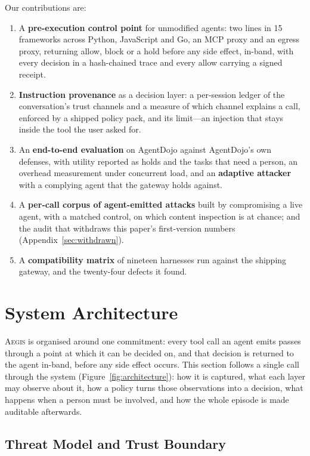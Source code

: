 \documentclass[sigconf,nonacm]{acmart}
\newcommand{\system}{\textsc{Aegis}\xspace}
\begin{document}
\medskip\noindent Our contributions are:
\begin{enumerate}[nolistsep,leftmargin=*]
\item A \textbf{pre-execution control point} for unmodified agents: two
      lines in 15 frameworks across Python, JavaScript and Go, an MCP
      proxy and an egress proxy, returning allow, block or a hold before
      any side effect, in-band, with every decision in a hash-chained
      trace and every allow carrying a signed receipt.
\item \textbf{Instruction provenance} as a decision layer: a per-session
      ledger of the conversation's trust channels and a measure of which
      channel explains a call, enforced by a shipped policy pack, and its
      limit---an injection that stays inside the tool the user asked for.
\item An \textbf{end-to-end evaluation} on AgentDojo against AgentDojo's own defenses, with utility reported as holds and the tasks that need a person, an overhead measurement under concurrent load, and an \textbf{adaptive attacker} with a complying agent that the gateway holds against.
\item A \textbf{per-call corpus of agent-emitted attacks} built by
      compromising a live agent, with a matched control, on which content
      inspection is at chance; and the audit that withdraws this paper's
      first-version numbers (Appendix~\ref{sec:withdrawn}).
\item A \textbf{compatibility matrix} of nineteen harnesses run against
      the shipping gateway, and the twenty-four defects it found.
\end{enumerate}

\section{System Architecture}
\label{sec:arch}

\system is organised around one commitment: every tool call an agent
emits passes through a point at which it can be decided on, and that
decision is returned to the agent in-band, before any side effect occurs.
This section follows a single call through the system (Figure~\ref{fig:architecture}): how it is
captured, what each layer may observe about it, how a policy turns those
observations into a decision, what happens when a person must be
involved, and how the whole episode is made auditable afterwards.

\subsection{Threat Model and Trust Boundary}
\label{sec:threat}
\end{document}
